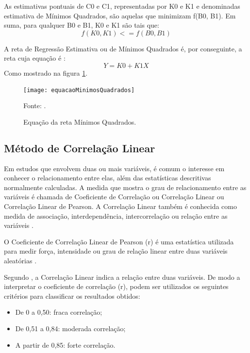 As estimativas pontuais de C0 e C1, representadas por K0 e K1 e denominadas estimativa de Mínimos Quadrados, são aquelas que minimizam f(B0, B1). Em suma,  para qualquer B0 e B1, K0 e K1 são tais que:
\begin{equation}
f(K0,K1) <= f(B0,B1)
\end{equation}

A reta de Regressão Estimativa ou de Mínimos Quadrados é, por conseguinte, a reta cuja equação é :
\begin{equation}
Y = K0 + K1X 
\end{equation}
Como mostrado na figura \ref{equacaoMinimos}\cite[pág.~441]{devore2006}.

\graphicspath{{figuras/}}
\begin{figure}[htp]
\centering
\texttt{[image: equacaoMinimosQuadrados]}
\caption{Equação da reta Mínimos Quadrados.}{Fonte: .} 
\label{equacaoMinimos}
\end{figure}

\subsection{Método de Correlação Linear}

Em estudos que envolvem duas ou mais variáveis, é comum o interesse em conhecer o relacionamento entre elas, além das estatísticas descritivas normalmente calculadas. A medida que mostra o grau de relacionamento entre as variáveis é chamada de Coeficiente de Correlação ou Correlação Linear ou Correlação Linear de Pearson. A Correlação Linear também é conhecida como medida de associação, interdependência, intercorrelação ou relação entre as variáveis \cite[pág.~62]{lira2004}.

O Coeficiente de Correlação Linear de Pearson (r) é uma estatística utilizada para medir força, intensidade ou grau de relação linear entre duas variáveis aleatórias \cite[pág.~664]{ferreira2009}.

Segundo , a Correlação Linear indica a relação entre duas variáveis. De modo a interpretar o coeficiente de correlação (r), podem ser utilizados os seguintes critérios para classificar os resultados obtidos:

\begin{itemize}
\item De 0 a 0,50: fraca correlação; 
\item De 0,51 a 0,84: moderada correlação;
\item A partir de 0,85: forte correlação.
\end{itemize}


